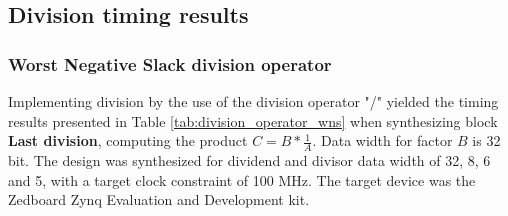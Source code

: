 %
%

\subsection{Division timing results}
\subsubsection{Worst Negative Slack division operator}
Implementing division by the use of the division operator "/" yielded the timing results presented in Table \ref{tab:division_operator_wns} when synthesizing block \textbf{Last division}, computing the product $C= B*\frac{1}{A}$. Data width for factor $B$ is 32 bit. The design was synthesized for dividend and divisor data width of 32, 8, 6 and 5, with a target clock constraint of 100 MHz. The target device was the Zedboard Zynq Evaluation and Development kit. 
\begin{table}[H]
    \centering
    \caption{Synthesis results for ZedBoard Zynq Evaluation and Development Kit for \textbf{Last division} using division operator "/".}
    \label{tab:division_operator_wns}
\end{table}

